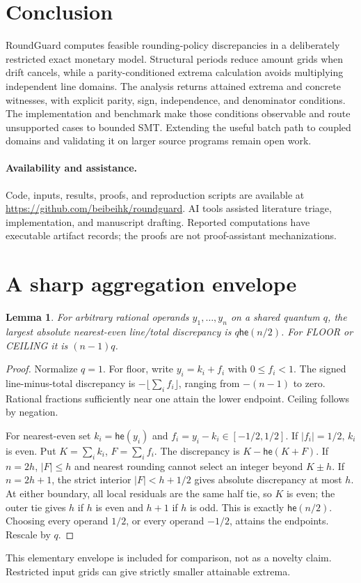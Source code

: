 \documentclass[11pt]{article}
\newtheorem{lemma}[theorem]{Lemma}
\newcommand{\he}{\mathsf{he}}
\begin{document}
\section{Conclusion}
RoundGuard computes feasible rounding-policy discrepancies in a deliberately restricted exact monetary model. Structural periods reduce amount grids when drift cancels, while a parity-conditioned extrema calculation avoids multiplying independent line domains. The analysis returns attained extrema and concrete witnesses, with explicit parity, sign, independence, and denominator conditions. The implementation and benchmark make those conditions observable and route unsupported cases to bounded SMT. Extending the useful batch path to coupled domains and validating it on larger source programs remain open work.

\paragraph{Availability and assistance.}
Code, inputs, results, proofs, and reproduction scripts are available at \url{https://github.com/beibeihk/roundguard}. AI tools assisted literature triage, implementation, and manuscript drafting. Reported computations have executable artifact records; the proofs are not proof-assistant mechanizations.



\appendix
\section{A sharp aggregation envelope}
\begin{lemma}\label{lem:sharp}
For arbitrary rational operands $y_1,\ldots,y_n$ on a shared quantum $q$, the largest absolute nearest-even line/total discrepancy is $q\he(n/2)$. For FLOOR or CEILING it is $(n-1)q$.
\end{lemma}
\begin{proof}
Normalize $q=1$. For floor, write $y_i=k_i+f_i$ with $0\le f_i<1$. The signed line-minus-total discrepancy is $-\lfloor\sum_i f_i\rfloor$, ranging from $-(n-1)$ to zero. Rational fractions sufficiently near one attain the lower endpoint. Ceiling follows by negation.

For nearest-even set $k_i=\he(y_i)$ and $f_i=y_i-k_i\in[-1/2,1/2]$. If $|f_i|=1/2$, $k_i$ is even. Put $K=\sum_i k_i$, $F=\sum_i f_i$. The discrepancy is $K-\he(K+F)$. If $n=2h$, $|F|\le h$ and nearest rounding cannot select an integer beyond $K\pm h$. If $n=2h+1$, the strict interior $|F|<h+1/2$ gives absolute discrepancy at most $h$. At either boundary, all local residuals are the same half tie, so $K$ is even; the outer tie gives $h$ if $h$ is even and $h+1$ if $h$ is odd. This is exactly $\he(n/2)$. Choosing every operand $1/2$, or every operand $-1/2$, attains the endpoints. Rescale by $q$.
\end{proof}
This elementary envelope is included for comparison, not as a novelty claim. Restricted input grids can give strictly smaller attainable extrema.
\end{document}
